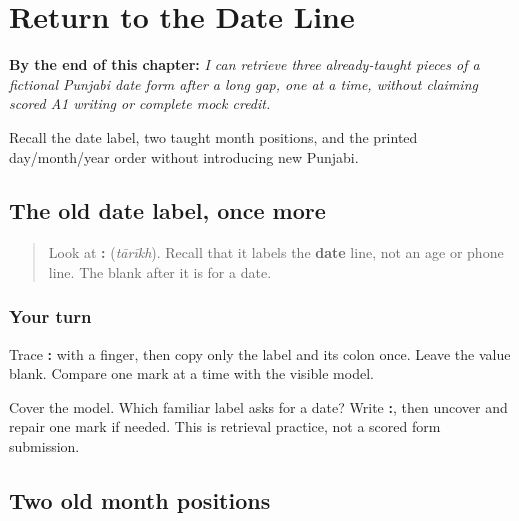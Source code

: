 
\chapter{Return to the Date Line}
\label{ch:pa-date-form-r4}

\begin{chapteropening}
\textbf{By the end of this chapter:} \emph{I can retrieve three already-taught pieces of a fictional Punjabi date form after a long gap, one at a time, without claiming scored A1 writing or complete mock credit.}

Recall the date label, two taught month positions, and the printed day/month/year order without introducing new Punjabi.
\end{chapteropening}

\section[\texorpdfstring{\pa{ਤਾਰੀਖ਼} (tārīkh)}{ਤਾਰੀਖ਼ (tārīkh)}]{The old date label, once more}

\label{lesson:PA-R168-date-label-again}



\begin{quote}
Look at \textbf{:} (\emph{tārīkh}). Recall that it labels the \textbf{date} line, not an age or phone line. The blank after it is for a date.
\end{quote}

\subsection*{Your turn}
Trace \textbf{:} with a finger, then copy only the label and its colon once. Leave the value blank. Compare one mark at a time with the visible model.

\begin{tcolorbox}[breakable,colback=teal!4,colframe=teal!35!black,title={Before you move on}]
Cover the model. Which familiar label asks for a date? Write \textbf{:}, then uncover and repair one mark if needed. This is retrieval practice, not a scored form submission.
\end{tcolorbox}
\section[\texorpdfstring{\pa{੦੧} · \pa{੦੨} (January …)}{੦੧ · ੦੨ (January …)}]{Two old month positions}

